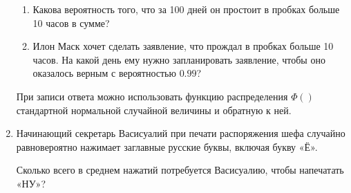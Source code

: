 \documentclass[12pt]{article}
\begin{document}
\begin{enumerate}
  \begin{enumerate}
    \item Какова вероятность того, что за 100 дней он простоит в пробках больше 10 часов в сумме?
    \item Илон Маск хочет сделать заявление, что прождал в пробках больше 10 часов. 
    На какой день ему нужно запланировать заявление, чтобы оно оказалось верным с вероятностью $0.99$?
  \end{enumerate}
  

  При записи ответа можно использовать функцию распределения $\Phi()$ стандартной нормальной случайной величины
  и обратную к ней. 




  

  \item Начинающий секретарь Васисуалий при печати распоряжения шефа случайно 
  равновероятно нажимает заглавные русские буквы, включая букву «Ё».
  
  Сколько всего в среднем нажатий потребуется Васисуалию, чтобы напечатать «НУ»?
\end{enumerate}
\end{document}
